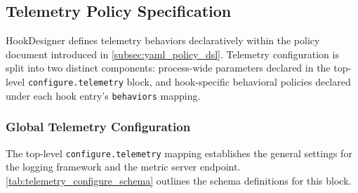 \subsection{Telemetry Policy Specification}
\label{subsec:telemetry_dsl}

HookDesigner defines telemetry behaviors declaratively within the policy document introduced in \cref{subsec:yaml_policy_dsl}.
Telemetry configuration is split into two distinct components: process-wide parameters declared in the top-level \texttt{configure.telemetry} block, and hook-specific behavioral policies declared under each hook entry's \texttt{behaviors} mapping.

\subsubsection{Global Telemetry Configuration}

The top-level \texttt{configure.telemetry} mapping establishes the general settings for the logging framework and the metric server endpoint.
\cref{tab:telemetry_configure_schema} outlines the schema definitions for this block.


